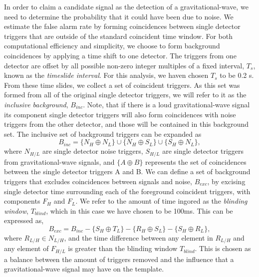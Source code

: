 In order to claim a candidate signal as the detection of a gravitational-wave, we need to determine the probability that it could have been due to noise. We estimate the false alarm rate by forming coincidences between single detector triggers that are outside of the standard coincident time window. For both computational efficiency and simplicity, we choose to form background coincidences by applying a time shift to one detector. The triggers from one detector are offset by all possible non-zero integer multiples of a fixed interval, $T_s$, known as the \emph{timeslide interval}. For this analysis, we haven chosen $T_s$ to be 0.2 s. From these time slides, we collect a set of coincident triggers. As this set was formed from all of the original single detector triggers, we will refer to it as the \textit{inclusive background}, $B_{inc}$. Note, that if there is a loud gravitational-wave signal its component single detector triggers will also form coincidences with noise triggers from the other detector, and those will be contained in this background set. The inclusive set of background triggers can be expanded as
%
\begin{equation}
B_{inc} = \{N_H \oplus N_L\} \cup \{ N_H \oplus S_L \} \cup \{S_H \oplus N_L\},
\end{equation}
where $N_{H/L}$ are single detector noise triggers, $S_{H/L}$ are single detector triggers from gravitational-wave signals, and $\{A \oplus B\}$ represents the set of coincidences between the single detector triggers A and B. We can define a set of background triggers that excludes coincidences between signals and noise, $B_{exc}$, by excising single detector time surrounding each of the foreground coincident triggers, with components $F_H$ and $F_L$. We refer to the amount of time ingored as the \emph{blinding window}, $T_{blind}$, which in this case we have chosen to be 100ms. This can be expressed as,
%
\begin{equation}
B_{exc} = B_{inc} - \{S_H \oplus T_L\} - \{R_H \oplus S_L\} - \{S_H \oplus R_L\},
\end{equation}
%
where $R_{L/H} \in N_{L/H}$, and the time difference between any element in $R_{L/H}$ and any element of $F_{H/L}$ is greater than the blinding window $T_{blind}$. This is chosen as a balance between the amount of triggers removed and the influence that a gravitational-wave signal may have on the template. 


